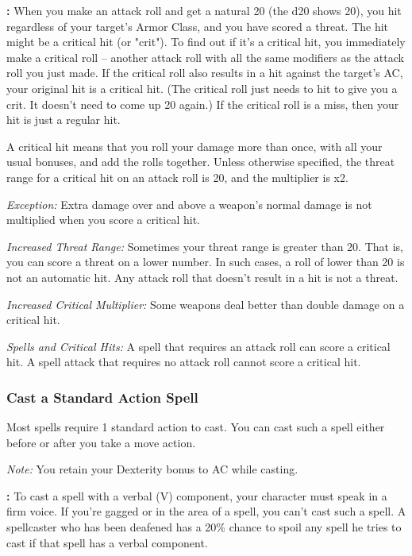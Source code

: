 \textbf{:} When you make an attack roll and get a natural 20 (the 
d20 shows 20), you hit regardless of your target's Armor Class, and you have scored 
a threat. The hit might be a critical hit (or "crit"). To find out if it's a 
critical hit, you immediately make a critical roll -- another attack roll with all 
the same modifiers as the attack roll you just made. If the critical roll also 
results in a hit against the target's AC, your original hit is a critical hit. 
(The critical roll just needs to hit to give you a crit. It doesn't need to come 
up 20 again.) If the critical roll is a miss, then your hit is just a regular hit.

A critical hit means that you roll your damage more than once, with all your usual 
bonuses, and add the rolls together. Unless otherwise specified, the threat range 
for a critical hit on an attack roll is 20, and the multiplier is x2.

\textit{Exception:} Extra damage over and above a weapon's normal damage 
is not multiplied when you score a critical hit.

\textit{Increased Threat Range:} Sometimes your threat range is greater 
than 20. That is, you can score a threat on a lower number. In such cases, a roll 
of lower than 20 is not an automatic hit. Any attack roll that doesn't result in 
a hit is not a threat.

\textit{Increased Critical Multiplier:} Some weapons deal better than 
double damage on a critical hit.

\textit{Spells and Critical Hits:} A spell that requires an attack roll
can score a critical hit. A spell attack that requires no attack roll
cannot score a critical hit.

\subsubsection{Cast a Standard Action Spell}

Most spells require 1 standard action to cast. You can cast such a spell either 
before or after you take a move action. 

\textit{Note:} You retain your Dexterity bonus to AC while casting.

\textbf{:} To cast a spell with a verbal (V) component, your character 
must speak in a firm voice. If you're gagged or in the area of a 
spell, you can't cast such a spell. A spellcaster who has been deafened has a 
20\% chance to spoil any spell he tries to cast if that spell has a verbal component.

